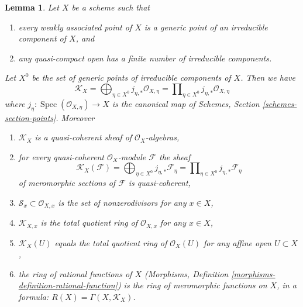 \documentclass[10pt,a4paper]{amsart}
\theoremstyle{plain}
\newtheorem{lemma}[subsection]{Lemma}
\theoremstyle{definition}
\theoremstyle{remark}
\numberwithin{equation}{subsection}
\def\Spec{\mathop{\mathrm{Spec}}}
\begin{document}
\begin{lemma}
\label{lemma-meromorphic-weakass-finite}
Let $X$ be a scheme such that
\begin{enumerate}
\item[(a)] every weakly associated point of $X$ is a generic point of an
irreducible component of $X$, and
\item[(b)] any quasi-compact open has a finite number of irreducible components.
\end{enumerate}
Let $X^0$ be the set of generic points of irreducible components of $X$.
Then we have
$$
\mathcal{K}_X =
\bigoplus\nolimits_{\eta \in X^0} j_{\eta, *}\mathcal{O}_{X, \eta} =
\prod\nolimits_{\eta \in X^0} j_{\eta, *}\mathcal{O}_{X, \eta}
$$
where $j_\eta : \Spec(\mathcal{O}_{X, \eta}) \to X$ is the canonical map
of Schemes, Section \ref{schemes-section-points}. Moreover
\begin{enumerate}
\item $\mathcal{K}_X$ is a quasi-coherent sheaf of
$\mathcal{O}_X$-algebras,
\item for every quasi-coherent $\mathcal{O}_X$-module $\mathcal{F}$ the sheaf
$$
\mathcal{K}_X(\mathcal{F}) =
\bigoplus\nolimits_{\eta \in X^0} j_{\eta, *}\mathcal{F}_\eta =
\prod\nolimits_{\eta \in X^0} j_{\eta, *}\mathcal{F}_\eta
$$
of meromorphic sections of $\mathcal{F}$
is quasi-coherent,
\item $\mathcal{S}_x \subset \mathcal{O}_{X, x}$
is the set of nonzerodivisors for any $x \in X$,
\item $\mathcal{K}_{X, x}$ is the total quotient ring of $\mathcal{O}_{X, x}$
for any $x \in X$,
\item $\mathcal{K}_X(U)$ equals the total quotient ring of $\mathcal{O}_X(U)$
for any affine open $U \subset X$,
\item the ring of rational functions of $X$
(Morphisms, Definition \ref{morphisms-definition-rational-function})
is the ring of meromorphic
functions on $X$, in a formula: $R(X) = \Gamma(X, \mathcal{K}_X)$.
\end{enumerate}
\end{lemma}
\end{document}
